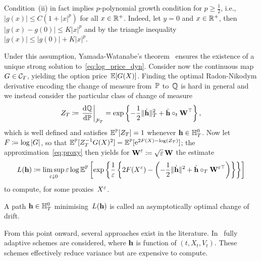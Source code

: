 \begin{remark}
Condition~(ii) in fact implies $p$-polynomial growth condition for $p\geq\frac{1}{2}$, i.e., $|g(x)|\leq C(1 + |x|^p)$ for all $x\in\mathbb{R}^+$. Indeed, let $y=0$ and $x\in\mathbb{R}^+$, then $|g(x)-g(0)|\leq K|x|^p$ and by the triangle inequality $|g(x)|\leq|g(0)|+K|x|^p$.
\end{remark}
Under this assumption,
Yamada-Watanabe's theorem~\cite[Theorem 1]{Yamada1971OnEquations} ensures the existence of 
a unique strong solution to~\eqref{eq:log_price_dyn}.
Consider now the continuous map
$G\in\mathcal{C}_T$, 
yielding the option price~$\mathbb{E}[G(X)]$.
Finding the optimal Radon-Nikodym derivative encoding the change of measure from~$\mathbb{P}$ to~$\mathbb{Q}$ is hard in general and we instead consider the particular class of change of measure
\begin{equation}\label{eq:ZRadon}
Z_T\coloneqq \left.\frac{\mathrm{d} \mathbb{Q}}{\mathrm{d} \mathbb{P}}\right\vert_{\mathcal{F}_T} = \exp\left\{-\frac{1}{2}\|\dot{\boldsymbol{\mathrm{h}}}\|_{T}^2 + \dot{\boldsymbol{\mathrm{h}}}\circ_{t} \boldsymbol{\mathrm{W}}^\top \right\},
\end{equation}
which is well defined and satisfies $\mathbb{E}^{\mathbb{P}}[Z_T]=1$
whenever $\boldsymbol{\mathrm{h}} \in \mathbb{H}^0_T$.
Now let $F \coloneqq \log|G|$, so that
$\mathbb{E}^{\mathbb{P}}[Z_T^{-1} G(X)^2] = \mathbb{E}^{\mathbb{P}}[\mathrm{e}^{2F(X) - \log(Z_T)}]$; 
the approximation~\eqref{eq:proxy} then yields for $\boldsymbol{\mathrm{W}}^\varepsilon\coloneqq\sqrt{\varepsilon}\,\boldsymbol{\mathrm{W}}$ the estimate
\begin{equation}\label{eq:MinProblem}
L(\boldsymbol{\mathrm{h}})\coloneqq\limsup_{\varepsilon\downarrow 0}\varepsilon\log\mathbb{E}^{\mathbb{P}}\left[\exp\left\{\frac{1}{\varepsilon}\left\{2F(X^\varepsilon) - \left(-\frac{1}{2}\|\dot{\boldsymbol{\mathrm{h}}}\|^2 + \dot{\boldsymbol{\mathrm{h}}}\circ_T\boldsymbol{\mathrm{W}}^{\varepsilon\top}\right)\right\}\right\}\right]
\end{equation}
to compute, for some proxies~$X^\varepsilon$.
\begin{definition}\label{def:asyoptdrift}
A path $\boldsymbol{\mathrm{h}}\in \mathbb{H}_T^0$ 
minimising~$L(\boldsymbol{\mathrm{h}})$
is called an asymptotically optimal change of drift.
\end{definition}
From this point onward, several approaches exist in the literature. In~\cite{Dupuis2012ImportanceDiffusions, Hartmann2018ImportanceVariables, Dupuis2017ModerateEquations} fully adaptive schemes are considered, where $\boldsymbol{\mathrm{h}}$ is function of $(t, X_t, V_t)$. These schemes effectively reduce variance but are expensive to compute. 

